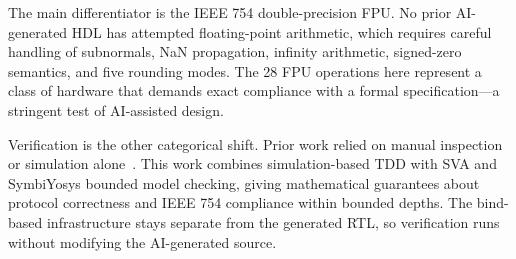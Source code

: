 \documentclass[journal]{IEEEtran}
\begin{document}
\begin{table}[!t]
\caption{Comparison with Prior Work in AI-Assisted HDL Generation}
\label{tab:comparison}
\centering
{}
\end{table}

The main differentiator is the IEEE 754 double-precision FPU. No prior AI-generated HDL has attempted floating-point arithmetic, which requires careful handling of subnormals, NaN propagation, infinity arithmetic, signed-zero semantics, and five rounding modes. The 28 FPU operations here represent a class of hardware that demands exact compliance with a formal specification---a stringent test of AI-assisted design.

Verification is the other categorical shift. Prior work relied on manual inspection~\cite{blocklove2023chipchat} or simulation alone~\cite{sun2024hdlgen, zhao2025resbench}. This work combines simulation-based TDD with SVA and SymbiYosys bounded model checking, giving mathematical guarantees about protocol correctness and IEEE 754 compliance within bounded depths. The bind-based infrastructure stays separate from the generated RTL, so verification runs without modifying the AI-generated source.
\end{document}
